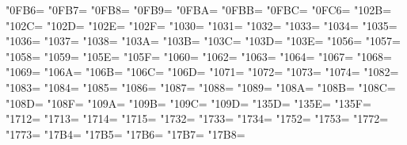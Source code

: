 \XeTeXcharclass"0FB6=\KclassCM
\XeTeXcharclass"0FB7=\KclassCM
\XeTeXcharclass"0FB8=\KclassCM
\XeTeXcharclass"0FB9=\KclassCM
\XeTeXcharclass"0FBA=\KclassCM
\XeTeXcharclass"0FBB=\KclassCM
\XeTeXcharclass"0FBC=\KclassCM
\XeTeXcharclass"0FC6=\KclassCM
\XeTeXcharclass"102B=\KclassCM
\XeTeXcharclass"102C=\KclassCM
\XeTeXcharclass"102D=\KclassCM
\XeTeXcharclass"102E=\KclassCM
\XeTeXcharclass"102F=\KclassCM
\XeTeXcharclass"1030=\KclassCM
\XeTeXcharclass"1031=\KclassCM
\XeTeXcharclass"1032=\KclassCM
\XeTeXcharclass"1033=\KclassCM
\XeTeXcharclass"1034=\KclassCM
\XeTeXcharclass"1035=\KclassCM
\XeTeXcharclass"1036=\KclassCM
\XeTeXcharclass"1037=\KclassCM
\XeTeXcharclass"1038=\KclassCM
\XeTeXcharclass"103A=\KclassCM
\XeTeXcharclass"103B=\KclassCM
\XeTeXcharclass"103C=\KclassCM
\XeTeXcharclass"103D=\KclassCM
\XeTeXcharclass"103E=\KclassCM
\XeTeXcharclass"1056=\KclassCM
\XeTeXcharclass"1057=\KclassCM
\XeTeXcharclass"1058=\KclassCM
\XeTeXcharclass"1059=\KclassCM
\XeTeXcharclass"105E=\KclassCM
\XeTeXcharclass"105F=\KclassCM
\XeTeXcharclass"1060=\KclassCM
\XeTeXcharclass"1062=\KclassCM
\XeTeXcharclass"1063=\KclassCM
\XeTeXcharclass"1064=\KclassCM
\XeTeXcharclass"1067=\KclassCM
\XeTeXcharclass"1068=\KclassCM
\XeTeXcharclass"1069=\KclassCM
\XeTeXcharclass"106A=\KclassCM
\XeTeXcharclass"106B=\KclassCM
\XeTeXcharclass"106C=\KclassCM
\XeTeXcharclass"106D=\KclassCM
\XeTeXcharclass"1071=\KclassCM
\XeTeXcharclass"1072=\KclassCM
\XeTeXcharclass"1073=\KclassCM
\XeTeXcharclass"1074=\KclassCM
\XeTeXcharclass"1082=\KclassCM
\XeTeXcharclass"1083=\KclassCM
\XeTeXcharclass"1084=\KclassCM
\XeTeXcharclass"1085=\KclassCM
\XeTeXcharclass"1086=\KclassCM
\XeTeXcharclass"1087=\KclassCM
\XeTeXcharclass"1088=\KclassCM
\XeTeXcharclass"1089=\KclassCM
\XeTeXcharclass"108A=\KclassCM
\XeTeXcharclass"108B=\KclassCM
\XeTeXcharclass"108C=\KclassCM
\XeTeXcharclass"108D=\KclassCM
\XeTeXcharclass"108F=\KclassCM
\XeTeXcharclass"109A=\KclassCM
\XeTeXcharclass"109B=\KclassCM
\XeTeXcharclass"109C=\KclassCM
\XeTeXcharclass"109D=\KclassCM
\XeTeXcharclass"135D=\KclassCM
\XeTeXcharclass"135E=\KclassCM
\XeTeXcharclass"135F=\KclassCM
\XeTeXcharclass"1712=\KclassCM
\XeTeXcharclass"1713=\KclassCM
\XeTeXcharclass"1714=\KclassCM
\XeTeXcharclass"1715=\KclassCM
\XeTeXcharclass"1732=\KclassCM
\XeTeXcharclass"1733=\KclassCM
\XeTeXcharclass"1734=\KclassCM
\XeTeXcharclass"1752=\KclassCM
\XeTeXcharclass"1753=\KclassCM
\XeTeXcharclass"1772=\KclassCM
\XeTeXcharclass"1773=\KclassCM
\XeTeXcharclass"17B4=\KclassCM
\XeTeXcharclass"17B5=\KclassCM
\XeTeXcharclass"17B6=\KclassCM
\XeTeXcharclass"17B7=\KclassCM
\XeTeXcharclass"17B8=\KclassCM
